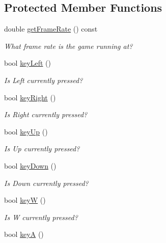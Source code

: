 \subsection*{Protected Member Functions}
\begin{DoxyCompactItemize}
\item 
double \mbox{\hyperlink{classbridges_1_1game_1_1_non_blocking_game_ab3bee2db9d0d2c4e74ae7943516fb53a}{get\+Frame\+Rate}} () const
\begin{DoxyCompactList}\small\item\em What frame rate is the game running at? \end{DoxyCompactList}\item 
bool \mbox{\hyperlink{classbridges_1_1game_1_1_non_blocking_game_a9b7ba679dd177b28f84ea24b9924a51c}{key\+Left}} ()
\begin{DoxyCompactList}\small\item\em Is Left currently pressed? \end{DoxyCompactList}\item 
bool \mbox{\hyperlink{classbridges_1_1game_1_1_non_blocking_game_afbea1fa2acec16e952be66ce76d496a9}{key\+Right}} ()
\begin{DoxyCompactList}\small\item\em Is Right currently pressed? \end{DoxyCompactList}\item 
bool \mbox{\hyperlink{classbridges_1_1game_1_1_non_blocking_game_a0a93cf74e7eac55c33f76cd55d525084}{key\+Up}} ()
\begin{DoxyCompactList}\small\item\em Is Up currently pressed? \end{DoxyCompactList}\item 
bool \mbox{\hyperlink{classbridges_1_1game_1_1_non_blocking_game_a52dd79aaaee9da77fa392fb8ec37fa94}{key\+Down}} ()
\begin{DoxyCompactList}\small\item\em Is Down currently pressed? \end{DoxyCompactList}\item 
bool \mbox{\hyperlink{classbridges_1_1game_1_1_non_blocking_game_a7bd5c2ab845e24525649dda7f8dfd460}{keyW}} ()
\begin{DoxyCompactList}\small\item\em Is W currently pressed? \end{DoxyCompactList}\item 
bool \mbox{\hyperlink{classbridges_1_1game_1_1_non_blocking_game_af88089437e34df580b247cb27047fd14}{keyA}} ()

\end{DoxyCompactItemize}
